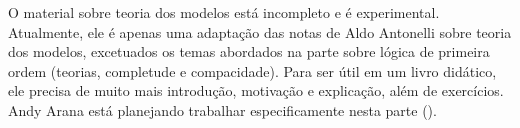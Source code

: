 \documentclass[../../include/open-logic-part]{subfiles}
\begin{document}

\begin{editorial}
  O material sobre teoria dos modelos está incompleto e é experimental. Atualmente, ele é
  apenas uma adaptação das notas de Aldo Antonelli sobre teoria dos
  modelos, excetuados os temas abordados na parte sobre lógica de primeira ordem
  (teorias, completude e compacidade). Para ser útil em um livro didático,
  ele precisa de muito mais introdução, motivação e explicação, além de exercícios.
  Andy Arana está planejando trabalhar especificamente nesta
  parte ().
\end{editorial}





\OLEndPartHook
\end{document}
